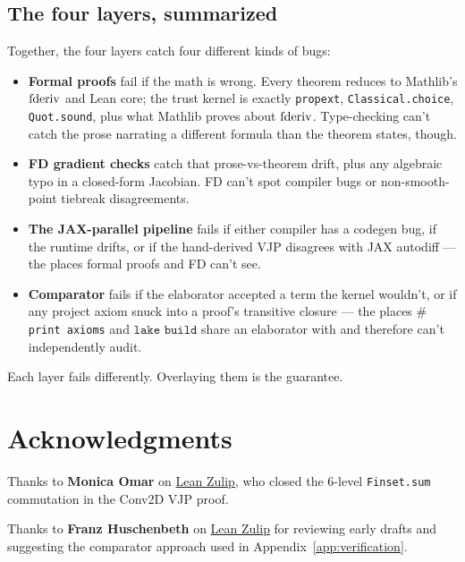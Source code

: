 \section{The four layers, summarized}

Together, the four layers catch four different kinds of bugs:

\begin{itemize}
  \item \textbf{Formal proofs} fail if the math is wrong. Every
    theorem reduces to Mathlib's \(\operatorname{fderiv}\) and Lean core; the
    trust kernel is exactly
    \texttt{propext}, \texttt{Classical.choice},
    \texttt{Quot.sound}, plus what Mathlib proves about
    \(\operatorname{fderiv}\). Type-checking can't catch the prose narrating
    a different formula than the theorem states, though.
  \item \textbf{FD gradient checks} catch that prose-vs-theorem
    drift, plus any algebraic typo in a closed-form Jacobian.
    FD can't spot compiler bugs or non-smooth-point tiebreak
    disagreements.
  \item \textbf{The JAX-parallel pipeline} fails if either
    compiler has a codegen bug, if the runtime drifts, or if
    the hand-derived VJP disagrees with JAX autodiff --- the
    places formal proofs and FD can't see.
  \item \textbf{Comparator} fails if the elaborator accepted a
    term the kernel wouldn't, or if any project axiom snuck into
    a proof's transitive closure --- the places \(\#\)\texttt{print
    axioms} and \(\texttt{lake build}\) share an elaborator with
    and therefore can't independently audit.
\end{itemize}

Each layer fails differently. Overlaying them is the guarantee.

\chapter*{Acknowledgments}

Thanks to \textbf{Monica Omar} on
\href{https://leanprover.zulipchat.com/}{Lean Zulip}, who closed
the 6-level \texttt{Finset.sum} commutation in the Conv2D VJP
proof.

\noindent Thanks to \textbf{Franz Huschenbeth} on
\href{https://leanprover.zulipchat.com/}{Lean Zulip} for reviewing
early drafts and suggesting the comparator approach used in
Appendix~\ref{app:verification}.
